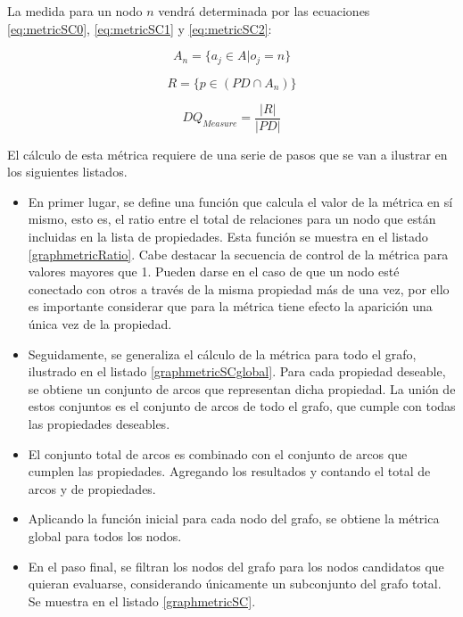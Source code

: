 La medida para un nodo $n$ vendrá determinada por las ecuaciones
\ref{eq:metricSC0}, \ref{eq:metricSC1} y \ref{eq:metricSC2}:

\begin{equation}
A_n = \{ a_j \in A | o_j = n  \}
  \label{eq:metricSC0}
\end{equation}

\begin{equation}
R = \{ p \in (PD \cap A_n) \}
  \label{eq:metricSC1}
\end{equation}

\begin{equation}
  DQ_{Measure} = 
  \frac{|R|}{|PD|}
  \label{eq:metricSC2}
\end{equation}




El cálculo de esta métrica requiere de una serie de pasos que se van a ilustrar
en los siguientes listados. 

\begin{itemize}
\item En primer lugar, se define una función que calcula el valor de la métrica en sí
mismo, esto es, el ratio entre el total de relaciones para un nodo que están
incluidas en la lista de propiedades. Esta función se muestra en el listado
\ref{graphmetricRatio}. Cabe destacar la secuencia de control de la métrica para
valores mayores que 1. Pueden darse en el caso de que un nodo esté conectado con
otros a través de la misma propiedad más de una vez, por ello es importante
considerar que para la métrica tiene efecto la aparición una única vez de la
propiedad. 
\item Seguidamente, se generaliza el cálculo de la métrica para todo el grafo,
ilustrado en el listado \ref{graphmetricSCglobal}. Para
cada propiedad deseable, se obtiene un conjunto de arcos que representan dicha
propiedad. La unión de estos conjuntos es el conjunto de arcos de todo el
grafo, que cumple con todas las propiedades deseables. 
\item El conjunto total de arcos es combinado con el conjunto de arcos que cumplen las
propiedades. Agregando los resultados y contando el total de arcos y de
propiedades. 
\item Aplicando la función inicial para cada nodo del grafo, se obtiene la métrica
global para todos los nodos. 
\item En el paso final, se filtran los nodos del grafo para los nodos candidatos que
quieran evaluarse, considerando únicamente un subconjunto del grafo total. Se muestra en el listado \ref{graphmetricSC}.

\end{itemize}

